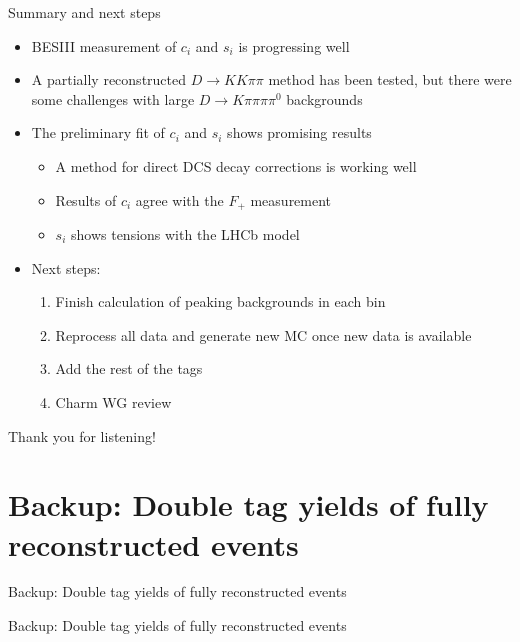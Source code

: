 \documentclass{beamer}
\begin{document}
\begin{frame}{Summary and next steps}
  \begin{itemize}
    \setlength\itemsep{0.8em}
    \item{BESIII measurement of $c_i$ and $s_i$ is progressing well}
    \item{A partially reconstructed $D\to KK\pi\pi$ method has been tested, but there were some challenges with large $D\to K\pi\pi\pi\pi^0$ backgrounds}
    \item{The preliminary fit of $c_i$ and $s_i$ shows promising results}
    \begin{itemize}
      \item{A method for direct DCS decay corrections is working well}
      \item{Results of $c_i$ agree with the $F_+$ measurement}
      \item{$s_i$ shows tensions with the LHCb model}
    \end{itemize}
    \item{Next steps:}
    \begin{enumerate}
      \item{Finish calculation of peaking backgrounds in each bin}
      \item{Reprocess all data and generate new MC once new data is available}
      \item{Add the rest of the tags}
      \item{Charm WG review}
    \end{enumerate}
  \end{itemize}
  \begin{center}
    \huge Thank you for listening!
  \end{center}
\end{frame}

\section{Backup: Double tag yields of fully reconstructed events}
\begin{frame}{Backup: Double tag yields of fully reconstructed events}
  \begin{center}
    {\huge Backup: Double tag yields of fully reconstructed events}
  \end{center}
\end{frame}
\end{document}
